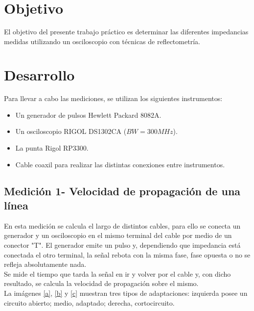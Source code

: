 \documentclass[a4paper,10pt]{article}
\title{  }
\begin{document}
	\maketitle %
	\newpage

	\tableofcontents %
	\newpage


	\section{Objetivo}
	
	\indent	El objetivo del presente trabajo práctico es determinar las 
	diferentes impedancias medidas utilizando un osciloscopio con técnicas de 
	reflectometría.
	
	\newpage
	\section{Desarrollo}
\indent Para llevar a cabo las mediciones, se utilizan los siguientes
		instrumentos:
		\begin{itemize}
			\item Un generador de pulsos Hewlett Packard 8082A.
			\item Un osciloscopio RIGOL DS1302CA ($BW=300MHz$).
			\item La punta Rigol RP3300.
			\item Cable coaxil para realizar las distintas conexiones entre 
			instrumentos.
		\end{itemize}	
	
		\subsection{Medici\'on 1- Velocidad de propagaci\'on de una l\'inea}
		\indent En esta medición se calcula el largo de distintos cables, para
		ello se conecta un generador y un osciloscopio en el mismo terminal 
		del cable por medio de un conector "T". El generador emite un pulso y,
		dependiendo que impedancia está conectada el otro terminal, la señal 
		rebota con la misma fase, fase opuesta o no se refleja absolutamente 
		nada. \\
		\indent Se mide el tiempo que tarda la señal en ir y volver por el 
		cable y, con dicho resultado, se calcula la velocidad de propagación 
		sobre el mismo.	\\
		\indent La imágenes \ref{a}, \ref{b} y \ref{c} muestran tres tipos de
		adaptaciones: izquierda posee un circuito abierto; medio, adaptado;
		derecha, cortocircuito. \\
	
\end{document}
